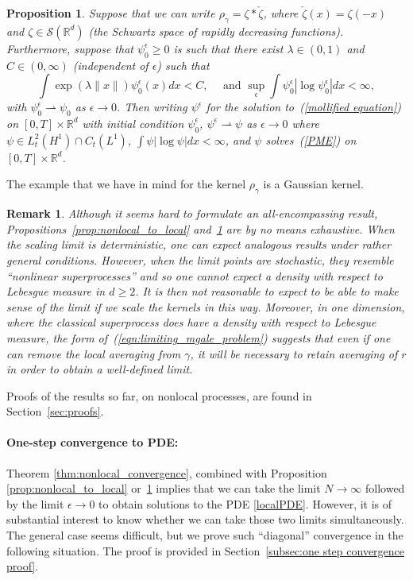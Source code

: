 \documentclass[12pt]{article}
\newtheorem{proposition}[theorem]{Proposition}
\newtheorem{remark}[theorem]{Remark}
\newcommand{\IR}{\mathbb R}
\numberwithin{equation}{section}
\begin{document}
\begin{proposition}
	\label{nonlocalPME to PME}
Suppose that
we can write $\rho_\gamma=\zeta*\check{\zeta}$, where $\check{\zeta}(x)=\zeta(-x)$ and
$\zeta\in\mathcal{S}(\IR^d)$ (the Schwartz space of rapidly decreasing functions).
Furthermore, suppose that %
$\psi_0^\epsilon\geq 0$ is such that
there exist $\lambda\in (0,1)$ and $C\in (0,\infty)$ (independent
of $\epsilon$) such that 
\begin{equation*}
\int\exp(\lambda \|x\|)\psi_0^\epsilon(x)dx<C,\quad\mbox{ and }
\sup_\epsilon\int \psi_0^\epsilon|\log \psi_0^\epsilon|dx<\infty,
\end{equation*}
with
$\psi_0^\epsilon\rightharpoonup \psi_0$ as $\epsilon\to 0$. Then
writing $\psi^\epsilon$ for the solution to~(\ref{mollified equation})
on $[0,T]\times \IR^d$ with
initial condition $\psi_0^\epsilon$,
$\psi^\epsilon\rightharpoonup \psi$ as $\epsilon\to 0$ where
$\psi\in L_t^2(H^1)\cap C_t(L^1)$, $\int \psi|\log \psi| dx<\infty$, and
$\psi$ solves~(\ref{PME}) on $[0,T]\times \IR^d$. 
\end{proposition}
The example that we have in mind for the kernel $\rho_\gamma$ is a Gaussian
kernel.
\begin{remark}
Although it seems hard to formulate an all-encompassing result,
Propositions~\ref{prop:nonlocal_to_local} and~\ref{nonlocalPME to PME} are by no
means exhaustive. When the scaling limit is deterministic, one can 
expect analogous results under rather general conditions. However, when the limit
points are stochastic, they resemble ``nonlinear superprocesses'' and so one cannot
expect a density with respect to Lebesgue measure in $d\geq 2$. It is then not
reasonable to 
expect to be able to make sense of the limit if we scale the kernels in this way.
Moreover, in one dimension, where the classical superprocess does have a density with 
respect to Lebesgue measure, the form of~(\ref{eqn:limiting_mgale_problem})
suggests that even if one can remove the local averaging from $\gamma$, it
will be necessary
to retain averaging of $r$ in order to obtain a well-defined limit. 
\end{remark}

Proofs of the results so far, on nonlocal processes, are found in Section~\ref{sec:proofs}.

\paragraph{One-step convergence to PDE:}
Theorem \ref{thm:nonlocal_convergence},
combined with Proposition \ref{prop:nonlocal_to_local} or~\ref{nonlocalPME to PME}
implies that we can take the limit $N \to \infty$
followed by the limit $\epsilon \to 0$
to obtain solutions to the PDE \eqref{localPDE}.
However, it is of substantial interest to know whether
we can take those two limits simultaneously.
The general case seems difficult,
but we prove such ``diagonal'' convergence in the following situation.
The proof is provided in Section~\ref{subsec:one step convergence proof}.
\end{document}

